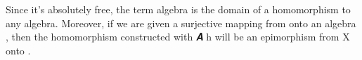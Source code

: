 \begin{code}
\>[1][@{}l@{\AgdaIndent{0}}]%
\>[2]\<%
\\
%
\>[2]\AgdaSpace{}%
\AgdaSymbol{:}\AgdaSpace{}%
\AgdaSymbol{(}\AgdaSpace{}%
\AgdaSpace{}%
\AgdaSymbol{)}\AgdaSpace{}%
\AgdaSymbol{(}\AgdaSpace{}%
\AgdaSpace{}%
\AgdaSpace{}%
\AgdaSpace{}%
\AgdaSymbol{)}\AgdaSpace{}%
\AgdaSpace{}%
\AgdaSymbol{(}\AgdaSpace{}%
\AgdaSpace{}%
\AgdaSymbol{)}\AgdaSpace{}%
\AgdaSymbol{(}\AgdaSpace{}%
\AgdaSpace{}%
\AgdaSpace{}%
\AgdaSpace{}%
\AgdaSymbol{)}\<%
\\
%
\>[2]\AgdaSpace{}%
\AgdaSymbol{=}\AgdaSpace{}%
\AgdaSpace{}%
\AgdaSymbol{(}\AgdaSpace{}%
\AgdaSpace{}%
\AgdaSymbol{)}\AgdaSpace{}%
\AgdaSymbol{(}\AgdaSpace{}%
\AgdaSpace{}%
\AgdaSpace{}%
\AgdaSpace{}%
\AgdaSpace{}%
\AgdaSpace{}%
\AgdaSpace{}%
\AgdaSpace{}%
\AgdaSpace{}%
\AgdaSpace{}%
\AgdaSymbol{(}\AgdaSpace{}%
\AgdaSymbol{))}\<%
\end{code}
\ccpad
Since it's absolutely free, the term algebra is the domain of a homomorphism to any algebra. Moreover, if we are given a surjective mapping  from  onto an algebra , then the homomorphism constructed with  \ab 𝑨 \ab h will be an epimorphism from  \ab X onto .
\ccpad
